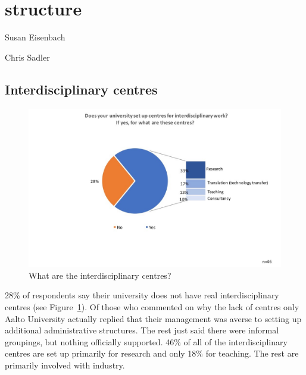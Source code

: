 \newpage
\section{structure}

Susan Eisenbach

Chris Sadler

\subsection{Interdisciplinary centres}

\begin{figure}[h]
\centering
\includegraphics[width = \linewidth]{charts/5a.jpg}
\caption{What are the interdisciplinary centres?}
\label{sect5:centres}
\end{figure}

28\% of respondents say their university does not have real interdisciplinary centres (see Figure~\ref{sect5:centres}). Of those who commented on why the lack of centres only Aalto University actually replied that their management was averse to setting up additional administrative structures. The rest just said there were informal groupings, but nothing officially supported. 46\% of all of the interdisciplinary centres are set up primarily for research and only 18\% for teaching. The rest are primarily involved with industry.

